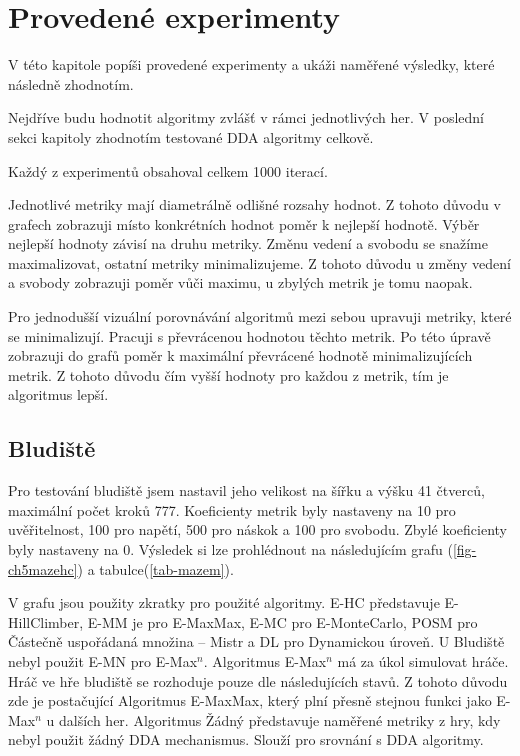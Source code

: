\chapter{Provedené experimenty}

V této kapitole popíši provedené experimenty a ukáži naměřené výsledky, které následně zhodnotím.

Nejdříve budu hodnotit algoritmy zvlášť v rámci jednotlivých her. V poslední sekci kapitoly zhodnotím testované DDA algoritmy celkově.

Každý z experimentů obsahoval celkem 1000 iterací.

Jednotlivé metriky mají diametrálně odlišné rozsahy hodnot. Z tohoto důvodu v grafech zobrazuji místo konkrétních hodnot poměr k nejlepší hodnotě. Výběr nejlepší hodnoty závisí na druhu metriky. Změnu vedení a svobodu se snažíme maximalizovat, ostatní metriky minimalizujeme. Z tohoto důvodu u změny vedení a svobody zobrazuji poměr vůči maximu, u zbylých metrik je tomu naopak.

Pro jednodušší vizuální porovnávání algoritmů mezi sebou upravuji metriky, které se minimalizují. Pracuji s převrácenou hodnotou těchto metrik. Po této úpravě zobrazuji do grafů poměr k maximální převrácené hodnotě minimalizujících metrik. Z tohoto důvodu čím vyšší hodnoty pro každou z metrik, tím je algoritmus lepší.

\section{Bludiště}

Pro testování bludiště jsem nastavil jeho velikost na šířku a výšku 41 čtverců, maximální počet kroků 777. Koeficienty metrik byly nastaveny na 10 pro uvěřitelnost, 100 pro napětí, 500 pro náskok a 100 pro svobodu. Zbylé koeficienty byly nastaveny na 0. Výsledek si lze prohlédnout na následujícím grafu (\ref{fig-ch5mazehc}) a tabulce(\ref{tab-mazem}).

V grafu jsou použity zkratky pro použité algoritmy. E-HC představuje E-HillClimber, E-MM je pro E-MaxMax, E-MC pro E-MonteCarlo, POSM pro Částečně uspořádaná množina – Mistr a DL pro Dynamickou úroveň. U Bludiště nebyl použit E-MN pro E-Max$^n$. Algoritmus E-Max$^n$ má za úkol simulovat hráče. Hráč ve hře bludiště se rozhoduje pouze dle následujících stavů. Z tohoto důvodu zde je postačující Algoritmus E-MaxMax, který plní přesně stejnou funkci jako E-Max$^n$ u dalších her. Algoritmus Žádný představuje naměřené metriky z hry, kdy nebyl použit žádný DDA mechanismus. Slouží pro srovnání s DDA algoritmy.

